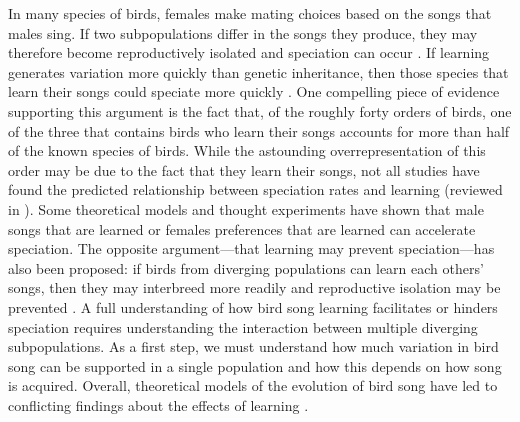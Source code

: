 \documentclass[12pt]{article}
\begin{document}
In many species of birds, females make mating choices based on the songs that males sing. If two subpopulations differ in the songs they produce, they may therefore become reproductively isolated and speciation can occur \cite{Slabbekoorn:2002kl}. If learning generates variation more quickly than genetic inheritance, then those species that learn their songs could speciate more quickly \cite{Beecher:2005ly}. One compelling piece of evidence supporting this argument is the fact that, of the roughly forty orders of birds, one of the three that contains birds who learn their songs accounts for more than half of the known species of birds. While the astounding overrepresentation of this order may be due to the fact that they learn their songs, not all studies have found the predicted relationship between speciation rates and learning (reviewed in \cite{Wilkins:2012ve,Lachlan:2004tg}).  Some theoretical models and thought experiments have shown that male songs that are learned \cite{Lachlan:2004tg,Irwin:2012hc} or females preferences that are learned \cite{Gilman:2015fk,Servedio:2013uq,Bailey:2012kx,Irwin:1999fk} can accelerate speciation. The opposite argument---that learning may prevent speciation---has also been proposed: if birds from diverging populations can learn each others' songs, then they may interbreed more readily and reproductive isolation may be prevented \cite{Seddon:2008bh}.  A full understanding of how bird song learning facilitates or hinders speciation requires understanding the interaction between multiple diverging subpopulations. As a first step, we must understand how much variation in bird song can be supported in a single population and how this depends on how song is acquired. Overall, theoretical models of the evolution of bird song have led to conflicting findings about the effects of learning \cite{Verzijden:2012uq}. 
\end{document}
